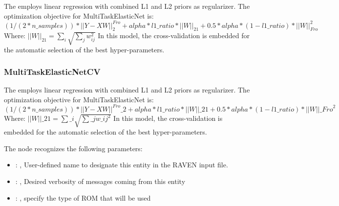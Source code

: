  The  employs                         linear regression with combined
 L1 and L2 priors as regularizer.                         The optimization objective for
 MultiTaskElasticNet is:                         $(1 / (2 * n\_samples)) * ||Y - XW||^{Fro}_2
 + alpha * l1\_ratio * ||W||_{21}                         + 0.5 * alpha * (1 - l1\_ratio) *
 ||W||_{Fro}^2$                         \\Where:                         $||W||_{21} = \sum_i
 \sqrt{\sum_j w_{ij}^2}$                         In this model, the cross-validation is embedded for
 the automatic selection                         of the best hyper-parameters.

\subsubsection{MultiTaskElasticNetCV}
  The  employs                         linear regression with
  combined L1 and L2 priors as regularizer.                         The optimization objective for
  MultiTaskElasticNet is:                         $(1 / (2 * n\_samples)) * ||Y - XW||^{Fro}\_2
  + alpha * l1\_ratio * ||W||\_{21}                         + 0.5 * alpha * (1 - l1\_ratio) *
  ||W||\_{Fro}^2$                         \\Where:                         $||W||\_{21} = \sum\_i
  \sqrt{\sum\_j w\_{ij}^2}$                         In this model, the cross-validation is embedded
  for the automatic selection                         of the best hyper-parameters.

  The  node recognizes the following parameters:
    \begin{itemize}
      \item {}: , 
        User-defined name to designate this entity in the RAVEN input file.
      \item {}: , 
        Desired verbosity of messages coming from this entity
      \item {}: , 
        specify the type of ROM that will be used
  \end{itemize}

